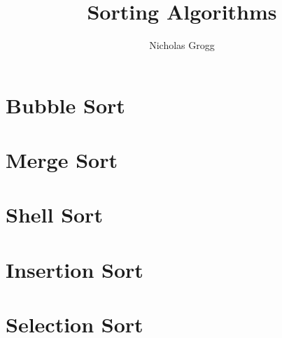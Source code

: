 \documentclass{article}
\title{Sorting Algorithms}
\author{Nicholas Grogg}
\begin{document}
\maketitle

\section{Bubble Sort}
\noindent
\section{Merge Sort}
\section{Shell Sort}
\section{Insertion Sort}
\section{Selection Sort}
\end{document}
